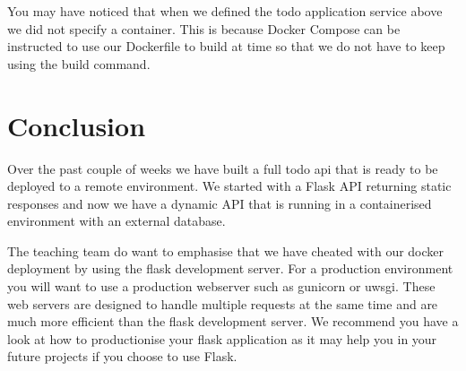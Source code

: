 \documentclass{csse4400}
\begin{document}
You may have noticed that when we defined the todo application service above we did not specify a container. This is because Docker Compose can be instructed to use our Dockerfile to build at time so that we do not have to keep using the build command.








\section{Conclusion}

Over the past couple of weeks we have built a full todo api that is ready to be deployed to a remote environment. We started with a Flask API returning static responses and now we have a dynamic API that is running in a containerised environment with an external database.

The teaching team do want to emphasise that we have cheated with our docker deployment by using the flask development server. For a production environment you will want to use a production webserver such as gunicorn or uwsgi. These web servers are designed to handle multiple requests at the same time and are much more efficient than the flask development server. We recommend you have a look at how to productionise your flask application as it may help you in your future projects if you choose to use Flask.



\end{document}
